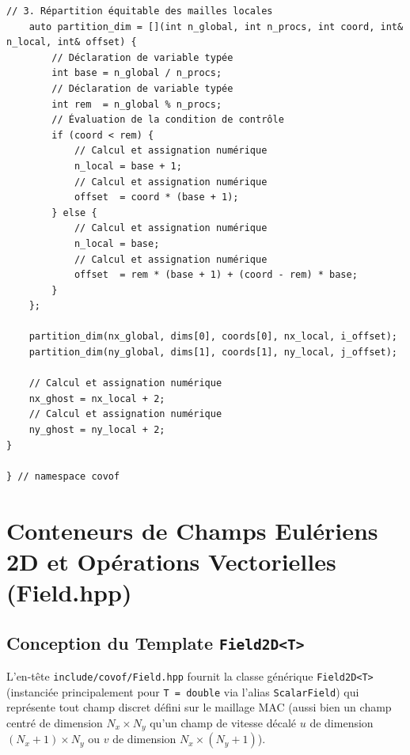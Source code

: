 \documentclass[10pt,a4paper,oneside]{book}
\begin{document}
\begin{lstlisting}[language={[11]C++}]
    // 3. Répartition équitable des mailles locales
    auto partition_dim = [](int n_global, int n_procs, int coord, int& n_local, int& offset) {
        // Déclaration de variable typée
        int base = n_global / n_procs;
        // Déclaration de variable typée
        int rem  = n_global % n_procs;
        // Évaluation de la condition de contrôle
        if (coord < rem) {
            // Calcul et assignation numérique
            n_local = base + 1;
            // Calcul et assignation numérique
            offset  = coord * (base + 1);
        } else {
            // Calcul et assignation numérique
            n_local = base;
            // Calcul et assignation numérique
            offset  = rem * (base + 1) + (coord - rem) * base;
        }
    };

    partition_dim(nx_global, dims[0], coords[0], nx_local, i_offset);
    partition_dim(ny_global, dims[1], coords[1], ny_local, j_offset);

    // Calcul et assignation numérique
    nx_ghost = nx_local + 2;
    // Calcul et assignation numérique
    ny_ghost = ny_local + 2;
}

} // namespace covof

\end{lstlisting}

\chapter{Conteneurs de Champs Eulériens 2D et Opérations Vectorielles (Field.hpp)}
\section{Conception du Template \texttt{Field2D<T>}}
L'en-tête \texttt{include/covof/Field.hpp} fournit la classe générique \texttt{Field2D<T>} (instanciée principalement pour \texttt{T = double} via l'alias \texttt{ScalarField}) qui représente tout champ discret défini sur le maillage MAC (aussi bien un champ centré de dimension $N_x \times N_y$ qu'un champ de vitesse décalé $u$ de dimension $(N_x+1) \times N_y$ ou $v$ de dimension $N_x \times (N_y+1)$).
\end{document}
